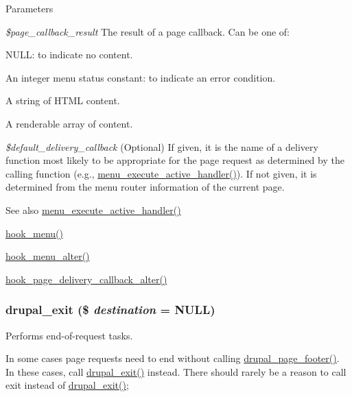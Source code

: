 \begin{DoxyParams}{Parameters}
\item[{\em \$page\_\-callback\_\-result}]The result of a page callback. Can be one of:
\begin{DoxyItemize}
\item NULL: to indicate no content.
\item An integer menu status constant: to indicate an error condition.
\item A string of HTML content.
\item A renderable array of content. 
\end{DoxyItemize}\item[{\em \$default\_\-delivery\_\-callback}](Optional) If given, it is the name of a delivery function most likely to be appropriate for the page request as determined by the calling function (e.g., \hyperlink{group__menu_gae33bae24fcac6126aa272d1c437f947c}{menu\_\-execute\_\-active\_\-handler()}). If not given, it is determined from the menu router information of the current page.\end{DoxyParams}
\begin{DoxySeeAlso}{See also}
\hyperlink{group__menu_gae33bae24fcac6126aa272d1c437f947c}{menu\_\-execute\_\-active\_\-handler()} 

\hyperlink{group__hooks_ga5c95244fea59b25666e409759e133ded}{hook\_\-menu()} 

\hyperlink{group__hooks_ga4c37deddcf48dbfe6f3081df1652f6fa}{hook\_\-menu\_\-alter()} 

\hyperlink{group__hooks_gaee6a1d02d5046d47069a8e385385ef15}{hook\_\-page\_\-delivery\_\-callback\_\-alter()} 
\end{DoxySeeAlso}
\hypertarget{common_8inc_abe82fff35edd9a4da0d3fe4ef1a95614}{
\subsubsection[{drupal\_\-exit}]{\setlength{\rightskip}{0pt plus 5cm}drupal\_\-exit (\$ {\em destination} = {\ttfamily NULL})}}
\label{common_8inc_abe82fff35edd9a4da0d3fe4ef1a95614}
Performs end-\/of-\/request tasks.

In some cases page requests need to end without calling \hyperlink{common_8inc_a64bc7d539a74e850935d73968788abd3}{drupal\_\-page\_\-footer()}. In these cases, call \hyperlink{common_8inc_abe82fff35edd9a4da0d3fe4ef1a95614}{drupal\_\-exit()} instead. There should rarely be a reason to call exit instead of \hyperlink{common_8inc_abe82fff35edd9a4da0d3fe4ef1a95614}{drupal\_\-exit()};


